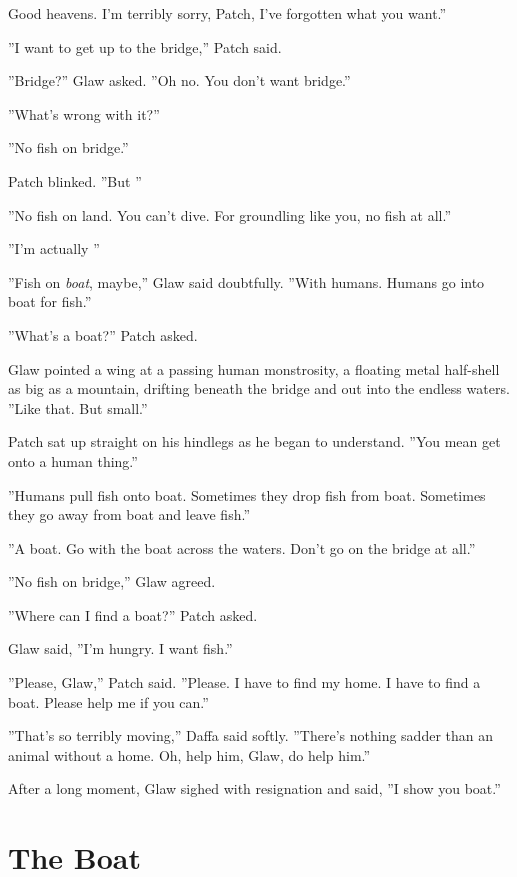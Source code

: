 \documentclass[12pt]{book}
\begin{document}
Good heavens. I'm terribly sorry, Patch, I've forgotten what you want.''\par
 ''I want to get up to the bridge,'' Patch said.\par
 ''Bridge?'' Glaw asked. ''Oh no. You don't want bridge.''\par
''What's wrong with it?''\par
''No fish on bridge.''\par
 Patch blinked. ''But %
''\par
 ''No fish on land. You can't dive. For groundling like you, no fish at all.''\par
 ''I'm actually %
''\par
 ''Fish on {\it boat}, maybe,'' Glaw said doubtfully. ''With humans. Humans go into boat for fish.''\par
 ''What's a boat?'' Patch asked.\par
 Glaw pointed a wing at a passing human monstrosity, a floating metal half-shell as big as a mountain, drifting beneath the bridge and out into the endless waters. ''Like that. But small.''\par
 Patch sat up straight on his hindlegs as he began to understand. ''You mean get onto a human thing.''\par
 ''Humans pull fish onto boat. Sometimes they drop fish from boat. Sometimes they go away from boat and leave fish.''\par
 ''A boat. Go with the boat across the waters. Don't go on the bridge at all.''\par
 ''No fish on bridge,'' Glaw agreed.\par
 ''Where can I find a boat?'' Patch asked.\par
 Glaw said, ''I'm hungry. I want fish.''\par
 ''Please, Glaw,'' Patch said. ''Please. I have to find my home. I have to find a boat. Please help me if you can.''\par
 ''That's so terribly moving,'' Daffa said softly. ''There's nothing sadder than an animal without a home. Oh, help him, Glaw, do help him.''\par
 After a long moment, Glaw sighed with resignation and said, ''I show you boat.''\par

\section{The Boat}
\end{document}
